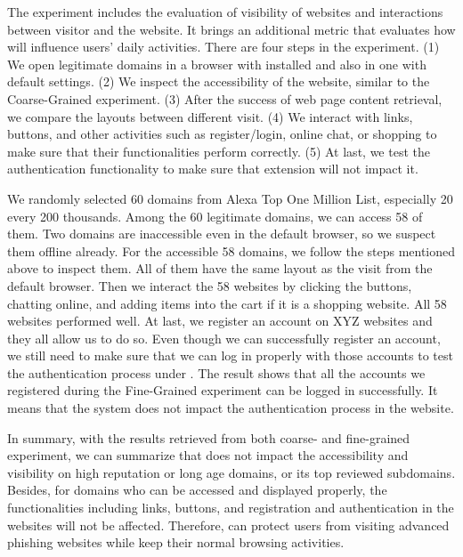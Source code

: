 The experiment includes the evaluation of visibility of websites and interactions between visitor and the website.
It brings an additional metric that evaluates how \spartacus will influence users' daily activities.
There are four steps in the experiment.
(1) We open legitimate domains in a browser with \spartacus installed and also in one with default settings.
(2) We inspect the accessibility of the website, similar to the Coarse-Grained experiment.
(3) After the success of web page content retrieval, we compare the layouts between different visit.
(4) We interact with links, buttons, and other activities such as register/login, online chat, or shopping to make sure that their functionalities perform correctly.
(5) At last, we test the authentication functionality to make sure that \spartacus extension will not impact it.

We randomly selected 60 domains from Alexa Top One Million List, especially 20 every 200 thousands.
Among the 60 legitimate domains, we can access 58 of them.
Two domains are inaccessible even in the default browser, so we suspect them offline already.
For the accessible 58 domains,
we follow the steps mentioned above to inspect them.
All of them have the same layout as the visit from the default browser.
Then we interact the 58 websites by clicking the buttons, chatting online, and adding items into the cart if it is a shopping website.
All 58 websites performed well.
At last, we register an account on XYZ websites and they all allow us to do so.
Even though we can successfully register an account, we still need to make sure that we can log in properly with those accounts to test the authentication process under \spartacus.
The result shows that all the accounts we registered during the Fine-Grained experiment can be logged in successfully.
It means that the \spartacus system does not impact the authentication process in the website.

In summary, with the results retrieved from both coarse- and fine-grained experiment, we can summarize that \spartacus does not impact the accessibility and visibility on high reputation or long age domains, or its top reviewed subdomains.
Besides, for domains who can be accessed and displayed properly, the functionalities including links, buttons, and registration and authentication in the websites will not be affected.
Therefore, \spartacus can protect users from visiting advanced phishing websites while keep their normal browsing activities.





